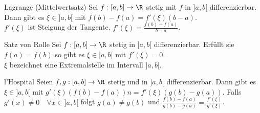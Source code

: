 



\begin{theorem}{Lagrange (Mittelwertsatz)}
    Sei $f:[a,b] \to \R$ stetig mit $f$ in $]a,b[$ differenzierbar. Dann gibt es $\xi \in ]a,b[$ mit $f(b) - f(a) = f'(\xi) (b-a)$.
    \\
    $f'(\xi)$ ist Steigung der Tangente. $f'(\xi) = \frac{f(b) - f(a)}{b - a}$.
\end{theorem}


\begin{theorem}{Satz von Rolle}
    Sei $f:[a,b] \to \R$ stetig in $]a,b[$ differenzierbar. Erfüllt sie $f(a) = f(b)$ so gibt es $\xi \in ]a,b[$ mit $f'(\xi) = 0$.
    \\
    $\xi$ bezeichnet eine Extremalstelle im Intervall $]a,b[$.
\end{theorem}

\begin{theorem}{l'Hospital}
    Seien $f,g : [a,b] \to \R$ stetig und in $]a,b[$ differenzierbar. Dann gibt es $\xi \in ]a,b[$ mit $g'(\xi)\left(f(b) - f(a)\right)n= f'(\xi) \left(g(b) - g(a)\right)$. Falls $g'(x) \neq 0 \quad \forall x \in ]a,b[$ folgt $g(a) \neq g(b)$ und $\frac{f(b) - f(a)}{g(b) - g(a)} = \frac{f'(\xi)}{g'(\xi)}$.
\end{theorem}









